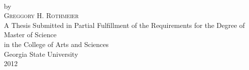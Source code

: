 \thispagestyle{empty}
\begin{titlepage}
\begin{center}
\normalsize
\textsc{\thesisTitle} \\
\vspace{1.0in}
by \\
\vspace{1.0in}
\textsc{Greggory H. Rothmeier} \\
\vspace{3.0in}
A Thesis Submitted in Partial Fulfillment of the Requirements for the Degree of\\
Master of Science\\
in the College of Arts and Sciences\\
Georgia State University\\
2012\\
\vspace*{\fill}
\end{center}
\end{titlepage}
